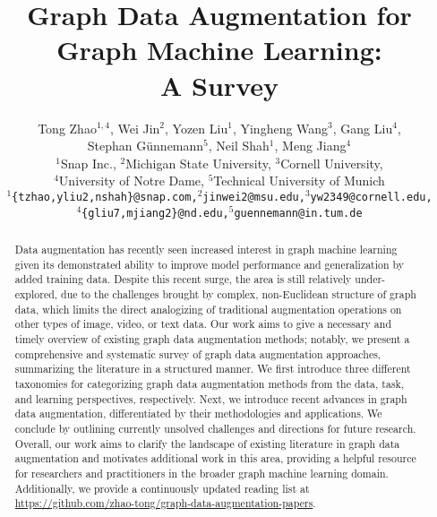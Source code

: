 \documentclass[11pt]{article}
\begin{document}
\title{Graph Data Augmentation for Graph Machine Learning:\\ A Survey}
\author
{Tong Zhao$^{1,4}$, Wei Jin$^2$, Yozen Liu$^1$, Yingheng Wang$^3$, Gang Liu$^4$, \\ 
Stephan Günnemann$^5$, Neil Shah$^1$, Meng Jiang$^4$ \\
\small{$^1$Snap Inc., $^2$Michigan State University, $^3$Cornell University,} \\
\small{$^4$University of Notre Dame, $^5$Technical University of Munich} \\
\small\texttt{$^1$\{tzhao,yliu2,nshah\}@snap.com,$^2$jinwei2@msu.edu,$^3$yw2349@cornell.edu,}\\
\small\texttt{$^4$\{gliu7,mjiang2\}@nd.edu,$^5$guennemann@in.tum.de}
}

\maketitle
\renewcommand\thesection{\arabic{section}}
\setcounter{section}{0}
\setcounter{figure}{0}
\setcounter{table}{0}


\begin{abstract}
Data augmentation has recently seen increased interest in graph machine learning given its demonstrated ability to improve model performance and generalization by added training data. Despite this recent surge, the area is still relatively under-explored, due to the challenges brought by complex, non-Euclidean structure of graph data, which limits the direct analogizing of traditional augmentation operations on other types of image, video, or text data.  Our work aims to give a necessary and timely overview of existing graph data augmentation methods; notably, we present a comprehensive and systematic survey of graph data augmentation approaches, summarizing the literature in a structured manner. We first introduce three different taxonomies for categorizing graph data augmentation methods from the data, task, and learning perspectives, respectively. Next, we introduce recent advances in graph data augmentation, differentiated by their methodologies and applications. We conclude by outlining currently unsolved challenges and directions for future research. Overall, our work aims to clarify the landscape of existing literature in graph data augmentation and motivates additional work in this area, providing a helpful resource for researchers and practitioners in the broader graph machine learning domain. Additionally, we provide a continuously updated reading list at \url{https://github.com/zhao-tong/graph-data-augmentation-papers}. 
\end{abstract}
\end{document}
